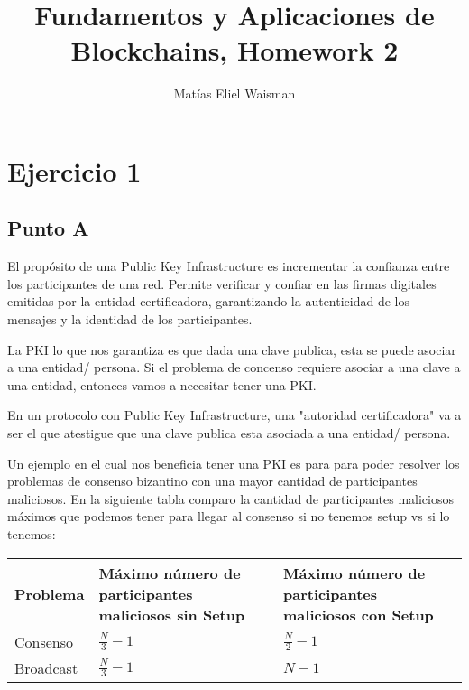 \documentclass[12pt]{article}
\title{\fontsize{16}{18}\selectfont Fundamentos y Aplicaciones de Blockchains, Homework 2}
\author{Matías Eliel Waisman}
\date{}
\begin{document}
\maketitle

\section*{Ejercicio 1}

\subsection*{Punto A}

El propósito de una Public Key Infrastructure es incrementar la confianza entre los participantes de una red. Permite verificar y confiar en las firmas digitales emitidas por la entidad certificadora, garantizando la autenticidad de los mensajes y la identidad de los participantes.  

La PKI lo que nos garantiza es que dada una clave publica, esta se puede asociar a una entidad/ persona. Si el problema de concenso requiere asociar a una clave a una entidad, entonces vamos a necesitar tener una PKI. 

En un protocolo con Public Key Infrastructure, una "autoridad certificadora" va a ser el que atestigue que una clave publica esta asociada a una entidad/ persona. 

Un ejemplo en el cual nos beneficia tener una PKI es para para poder resolver los problemas de consenso bizantino con una mayor cantidad de participantes maliciosos. En la siguiente tabla comparo la cantidad de participantes maliciosos máximos que podemos tener para llegar al consenso si no tenemos setup vs si lo tenemos:

\begin{center}
\begin{tabular}{|>{\centering\arraybackslash}m{3cm}|
                >{\centering\arraybackslash}m{5cm}|
                >{\centering\arraybackslash}m{5cm}|}
\hline
\textbf{Problema} & 
\textbf{Máximo número de participantes maliciosos sin Setup} & 
\textbf{Máximo número de participantes maliciosos con Setup} \\
\hline
Consenso & $\frac{N}{3} - 1$ & $\frac{N}{2} - 1$ \\
\hline
Broadcast & $\frac{N}{3} - 1$ & $N - 1$ \\
\hline
\end{tabular}
\end{center}
\end{document}
